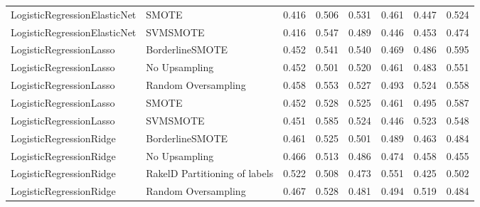 \begin{tabular}{llllllll}
   LogisticRegressionElasticNet &                         SMOTE & 0.416 &                     0.506 &                 0.531 &                  0.461 &                                   0.447 &     0.524 \\
   LogisticRegressionElasticNet &                      SVMSMOTE & 0.416 &                     0.547 &                 0.489 &                  0.446 &                                   0.453 &     0.474 \\
        LogisticRegressionLasso &               BorderlineSMOTE & 0.452 &                     0.541 &                 0.540 &                  0.469 &                                   0.486 &     0.595 \\
        LogisticRegressionLasso &                 No Upsampling & 0.452 &                     0.501 &                 0.520 &                  0.461 &                                   0.483 &     0.551 \\
        LogisticRegressionLasso &           Random Oversampling & 0.458 &                     0.553 &                 0.527 &                  0.493 &                                   0.524 &     0.558 \\
        LogisticRegressionLasso &                         SMOTE & 0.452 &                     0.528 &                 0.525 &                  0.461 &                                   0.495 &     0.587 \\
        LogisticRegressionLasso &                      SVMSMOTE & 0.451 &                     0.585 &                 0.524 &                  0.446 &                                   0.523 &     0.548 \\
        LogisticRegressionRidge &               BorderlineSMOTE & 0.461 &                     0.525 &                 0.501 &                  0.489 &                                   0.463 &     0.484 \\
        LogisticRegressionRidge &                 No Upsampling & 0.466 &                     0.513 &                 0.486 &                  0.474 &                                   0.458 &     0.455 \\
        LogisticRegressionRidge & RakelD Partitioning of labels & 0.522 &                     0.508 &                 0.473 &                  0.551 &                                   0.425 &     0.502 \\
        LogisticRegressionRidge &           Random Oversampling & 0.467 &                     0.528 &                 0.481 &                  0.494 &                                   0.519 &     0.484 \\

\end{tabular}
